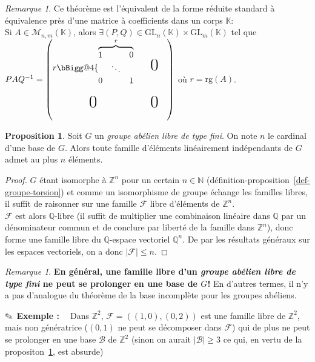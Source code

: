 \documentclass{report}
\makeatletter
\newcommand{\Q}{\mathbb{Q}}
\newcommand{\Z}{\mathbb{Z}}
\newcommand{\K}{\mathbb{K}}
\newcommand{\N}{\mathbb{N}}
\newcommand{\rg}[1]{\mathrm{rg}(#1)}
\newcommand{\x}{\times}
\theoremstyle{definition}
\newtheorem{prop}[defi]{Proposition}
\theoremstyle{remark}
\newtheorem{rem}[defi]{Remarque}
\newcommand{\exem}{{\textbf{$\text{\ding{46}}$ Exemple : \ }}}
\newcommand{\warning}[1]{{\bf{\fontencoding{U}\fontfamily{futs}\selectfont\char 66\relax} #1}}
\newcommand{\biggg}{\bBigg@{4}}
\makeatother
\begin{document}
\begin{rem}
Ce théorème est l'équivalent de la forme réduite standard à équivalence près d'une matrice à coefficients dans un corps $\K$:\\
Si $A\in \mathcal{M}_{n,m}(\K)$, alors $\exists (P,Q)\in\textrm{GL}_n(\K)\x\textrm{GL}_m(\K)$ tel que $PAQ^{-1}=
\begin{pmatrix}
	r\biggg\{\overbrace{
		\begin{matrix}1&&0\\
		&\ddots\\
		0&&1\end{matrix}
	}^{r} && \text{\huge0}&\\
	&\\
    \text{\huge0} && \text{\huge0}\\
	&
\end{pmatrix}$ o\`u $r=\rg{A}$.
\end{rem}

\begin{prop}\label{card-fam-libre}
Soit $G$ un \textit{groupe abélien libre de type fini}. On note $n$ le cardinal d'une base de $G$. Alors toute famille d'éléments linéairement indépendants de $G$ admet au plus $n$ éléments.
\end{prop}

\begin{proof}$G$ étant isomorphe à $\Z^n$ pour un certain $n \in \N$ (d\'efinition-proposition~\ref{def-groupe-torsion}) et comme un isomorphisme de groupe échange
les familles libres, il suffit de raisonner sur une famille $\mathcal{F}$ libre d'éléments de $\Z^n$.\\
$\mathcal{F}$ est alors $\Q$-libre (il suffit de multiplier une combinaison linéaire dans $\Q$ par un dénominateur commun et de conclure par libert\'e de la famille dans $\Z^n$), donc forme une famille libre du $\Q$-espace vectoriel $\Q^n$. De par les r\'esultats g\'en\'eraux sur les espaces vectoriels, on a donc $\vert \mathcal{F} \vert \leqslant n$.
\end{proof}

\begin{rem}
\warning{En g\'en\'eral, une famille libre d'un \textit{groupe abélien libre de type fini} ne peut se prolonger en une base de $G$!}\smallbreak
En d'autres termes, il n'y a pas d'analogue du théorème de la base incomplète pour les groupes abéliens.
\end{rem}

\exem
Dans $\Z^2$, $\mathcal{F}=((1,0),(0,2))$ est une famille libre de $\Z^2$, mais non g\'en\'eratrice ($(0,1)$ ne peut se d\'ecomposer dans $\mathcal{F}$) qui de plus
ne peut se prolonger en une base $\mathcal{B}$ de $\Z^2$ (sinon on aurait $|\mathcal{B}|\geq 3$ ce qui, en vertu de la propositon~\ref{card-fam-libre}, est absurde)
\end{document}
